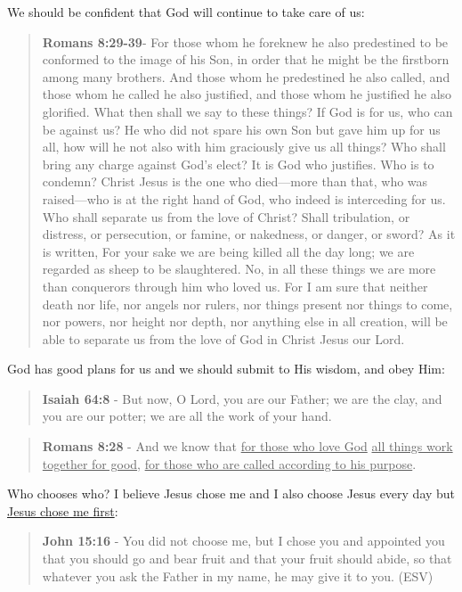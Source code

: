 \documentclass[11pt]{article}
\begin{document}
We should be confident that God will continue to take care of us:

\begin{quote}
\textbf{Romans 8:29-39}- For those whom he foreknew he also predestined to be conformed to the image of his Son, in order that he might be the firstborn among many brothers. And those whom he predestined he also called, and those whom he called he also justified, and those whom he justified he also glorified. What then shall we say to these things? If God is for us, who can be against us? He who did not spare his own Son but gave him up for us all, how will he not also with him graciously give us all things? Who shall bring any charge against God's elect? It is God who justifies. Who is to condemn? Christ Jesus is the one who died—more than that, who was raised—who is at the right hand of God, who indeed is interceding for us. Who shall separate us from the love of Christ? Shall tribulation, or distress, or persecution, or famine, or nakedness, or danger, or sword? As it is written, For your sake we are being killed all the day long; we are regarded as sheep to be slaughtered. No, in all these things we are more than conquerors through him who loved us. For I am sure that neither death nor life, nor angels nor rulers, nor things present nor things to come, nor powers, nor height nor depth, nor anything else in all creation, will be able to separate us from the love of God in Christ Jesus our Lord.
\end{quote}

God has good plans for us and we should submit to His wisdom, and obey Him:

\begin{quote}
\textbf{Isaiah 64:8} - But now, O Lord, you are our Father; we are the clay, and you are our potter; we are all the work of your hand.
\end{quote}

\begin{quote}
\textbf{Romans 8:28} - And we know that \uline{for those who love God} \uline{all things work together for good}, \uline{for those who are called according to his purpose}.
\end{quote}

Who chooses who? I believe Jesus chose me and I also choose Jesus every day but \uline{Jesus chose me first}:

\begin{quote}
\textbf{John 15:16} - You did not choose me, but I chose you and appointed you that you should go and bear fruit and that your fruit should abide, so that whatever you ask the Father in my name, he may give it to you. (ESV)
\end{quote}
\end{document}
